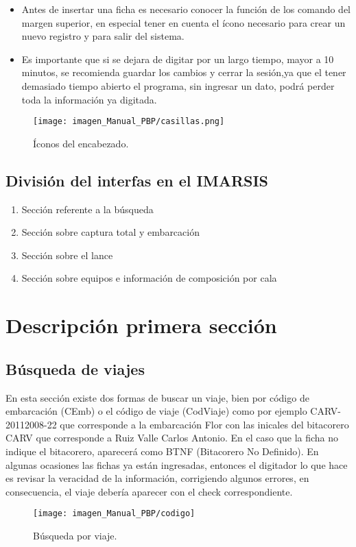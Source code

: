 \documentclass[a4paper,oneside,11pt]{book}
\begin{document}
\begin{itemize}
\item {Antes de insertar una ficha es necesario conocer la función de los comando del margen superior, en especial tener en cuenta el ícono necesario para crear un nuevo registro y para salir del sistema.}
\item {Es importante que si se dejara de digitar por un largo tiempo, mayor a 10 minutos, se recomienda guardar los cambios y cerrar la sesión,ya que el tener demasiado tiempo abierto el programa, sin ingresar un dato, podrá perder toda la información ya digitada.}
\end{itemize}
  \begin{figure} [!h]
  	\begin{center}
  		\texttt{[image: imagen\_Manual\_PBP/casillas.png]}
  		\vspace{-20pt}
  		\caption{Íconos del encabezado.}
  	\end{center}
  \end{figure}
 
 \subsection{División del interfas en el IMARSIS}
 \begin{enumerate}
 \item Sección referente a la búsqueda
 \item Sección sobre captura total y embarcación
 \item Sección sobre el lance
 \item Sección sobre equipos e información de composición por cala
 
 \end{enumerate}
 
\section{Descripción primera sección }
\subsection{Búsqueda de viajes}

En esta sección existe dos formas de buscar un viaje, bien por código de embarcación (CEmb) o el código de viaje (CodViaje) como por ejemplo CARV-20112008-22 que corresponde a la embarcación
Flor con las inicales del bitacorero CARV que corresponde a Ruiz Valle Carlos Antonio. En el caso que  la ficha no indique el bitacorero, aparecerá como BTNF (Bitacorero No Definido).
En algunas ocasiones las fichas ya están ingresadas, entonces el digitador lo que hace es revisar la veracidad de la información, corrigiendo algunos errores, en consecuencia, el viaje debería aparecer con el check correspondiente.
\begin{figure} [!h]
  	\begin{center}
  		\texttt{[image: imagen\_Manual\_PBP/codigo]}
  		\vspace{-5pt}
  		\caption{Búsqueda por viaje.}
  	\end{center}
  \end{figure}
\end{document}
